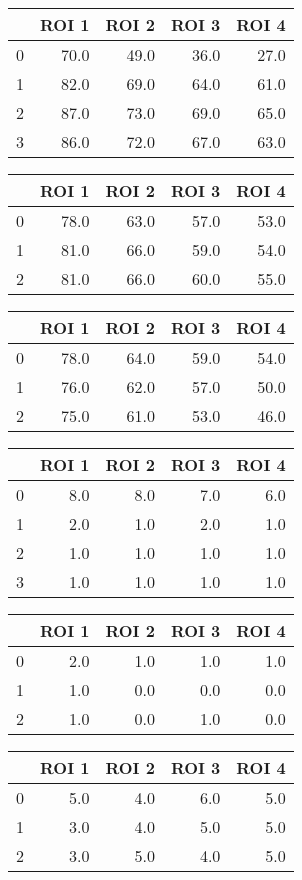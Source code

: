\begin{tabular}{lrrrr}
\toprule
{} &  ROI 1 &  ROI 2 &  ROI 3 &  ROI 4 \\
\midrule
0 &   70.0 &   49.0 &   36.0 &   27.0 \\
1 &   82.0 &   69.0 &   64.0 &   61.0 \\
2 &   87.0 &   73.0 &   69.0 &   65.0 \\
3 &   86.0 &   72.0 &   67.0 &   63.0 \\
\bottomrule
\end{tabular}
\begin{tabular}{lrrrr}
\toprule
{} &  ROI 1 &  ROI 2 &  ROI 3 &  ROI 4 \\
\midrule
0 &   78.0 &   63.0 &   57.0 &   53.0 \\
1 &   81.0 &   66.0 &   59.0 &   54.0 \\
2 &   81.0 &   66.0 &   60.0 &   55.0 \\
\bottomrule
\end{tabular}
\begin{tabular}{lrrrr}
\toprule
{} &  ROI 1 &  ROI 2 &  ROI 3 &  ROI 4 \\
\midrule
0 &   78.0 &   64.0 &   59.0 &   54.0 \\
1 &   76.0 &   62.0 &   57.0 &   50.0 \\
2 &   75.0 &   61.0 &   53.0 &   46.0 \\
\bottomrule
\end{tabular}
\begin{tabular}{lrrrr}
\toprule
{} &  ROI 1 &  ROI 2 &  ROI 3 &  ROI 4 \\
\midrule
0 &    8.0 &    8.0 &    7.0 &    6.0 \\
1 &    2.0 &    1.0 &    2.0 &    1.0 \\
2 &    1.0 &    1.0 &    1.0 &    1.0 \\
3 &    1.0 &    1.0 &    1.0 &    1.0 \\
\bottomrule
\end{tabular}
\begin{tabular}{lrrrr}
\toprule
{} &  ROI 1 &  ROI 2 &  ROI 3 &  ROI 4 \\
\midrule
0 &    2.0 &    1.0 &    1.0 &    1.0 \\
1 &    1.0 &    0.0 &    0.0 &    0.0 \\
2 &    1.0 &    0.0 &    1.0 &    0.0 \\
\bottomrule
\end{tabular}
\begin{tabular}{lrrrr}
\toprule
{} &  ROI 1 &  ROI 2 &  ROI 3 &  ROI 4 \\
\midrule
0 &    5.0 &    4.0 &    6.0 &    5.0 \\
1 &    3.0 &    4.0 &    5.0 &    5.0 \\
2 &    3.0 &    5.0 &    4.0 &    5.0 \\
\bottomrule
\end{tabular}
